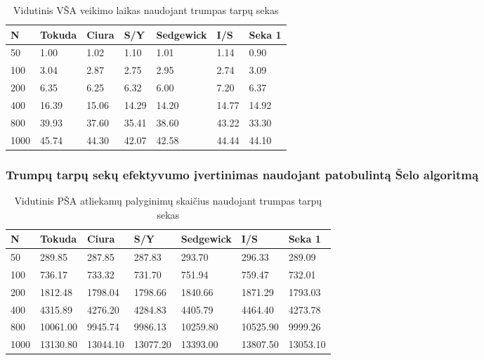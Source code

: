 \documentclass{VUMIFInfKursinis}
\begin{document}
\begin{table}[H]
  \caption{Vidutinis VŠA veikimo laikas naudojant trumpas tarpų sekas}
  \begin{tabular}{|l|l|l|l|l|l|l|}
  \hline
  N    & Tokuda & Ciura & S/Y   & Sedgewick & I/S   & Seka 1    \\ \hline
  50   & 1.00   & 1.02  & 1.10  & 1.01      & 1.14  & 0.90  \\ \hline
  100  & 3.04   & 2.87  & 2.75  & 2.95      & 2.74  & 3.09  \\ \hline
  200  & 6.35   & 6.25  & 6.32  & 6.00      & 7.20  & 6.37  \\ \hline
  400  & 16.39  & 15.06 & 14.29 & 14.20     & 14.77 & 14.92 \\ \hline
  800  & 39.93  & 37.60 & 35.41 & 38.60     & 43.22 & 33.30 \\ \hline
  1000 & 45.74  & 44.30 & 42.07 & 42.58     & 44.44 & 44.10 \\ \hline
  \end{tabular}
  \end{table}

\subsubsection{Trumpų tarpų sekų efektyvumo įvertinimas naudojant patobulintą Šelo algoritmą}

\begin{table}[H]
  \caption{Vidutinis PŠA atliekamų palyginimų skaičius naudojant trumpas tarpų sekas}
  \begin{tabular}{|l|l|l|l|l|l|l|}
  \hline
  N    & Tokuda   & Ciura    & S/Y      & Sedgewick & I/S      & Seka 1       \\ \hline
  50   & 289.85   & 287.85   & 287.83   & 293.70    & 296.33   & 289.09   \\ \hline
  100  & 736.17   & 733.32   & 731.70   & 751.94    & 759.47   & 732.01   \\ \hline
  200  & 1812.48  & 1798.04  & 1798.66  & 1840.66   & 1871.29  & 1793.03  \\ \hline
  400  & 4315.89  & 4276.20  & 4284.83  & 4405.79   & 4464.40  & 4273.78  \\ \hline
  800  & 10061.00 & 9945.74  & 9986.13  & 10259.80  & 10525.90 & 9999.26  \\ \hline
  1000 & 13130.80 & 13044.10 & 13077.20 & 13393.00  & 13807.50 & 13053.10 \\ \hline
  \end{tabular}
  \end{table}
\end{document}
